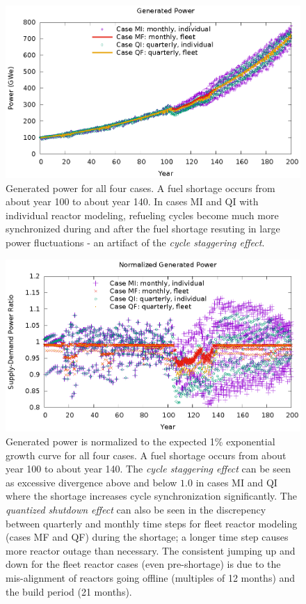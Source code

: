 \documentclass{style}
\begin{document}
\begin{figure}[!h]
    \centering
    \includegraphics[width=1.0\textwidth]{exp2/power.eps}
    \caption[Generated power]{
        Generated power for all four cases.  A fuel shortage occurs from about
        year 100 to about year 140.  In cases MI and QI with individual reactor
        modeling, refueling cycles become much more synchronized during and
        after the fuel shortage resuting in large power fluctuations - an artifact of the
        \emph{cycle staggering effect}.
    }
    \label{fig:power}
\end{figure}

\begin{figure}[!h]
    \centering
    \includegraphics[width=1.0\textwidth]{exp2/power-rel.eps}
    \caption[Normalized power]{
        Generated power is normalized to the expected 1\% exponential growth
        curve for all four cases.  A fuel shortage occurs from about year 100
        to about year 140.  The \emph{cycle staggering effect} can be seen as
        excessive divergence above and below $1.0$ in cases MI and QI where
        the shortage increases cycle synchronization significantly. The
        \emph{quantized shutdown effect} can also be seen in the discrepency
        between quarterly and monthly time steps for fleet reactor modeling
        (cases MF and QF) during the shortage; a longer time step causes more
        reactor outage than necessary. The consistent jumping up and down for
        the fleet reactor cases (even pre-shortage) is due to the mis-alignment of reactors going
        offline (multiples of 12 months) and the build period (21 months).
    }
    \label{fig:power-rel}
\end{figure}
\end{document}
